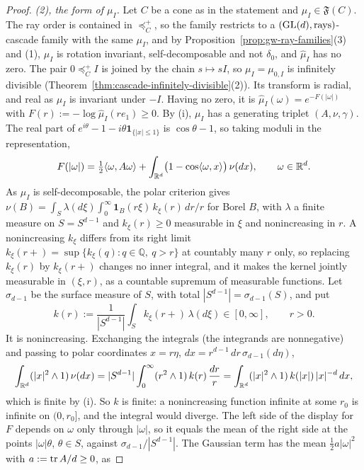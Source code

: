 \begin{proof}
\emph{(2), the form of $\mu_I$.} Let $C$ be a cone as in the statement and $\mu_I \in \mathfrak F(C)$. The ray order
is contained in $\preceq^+_C$, so the family restricts to a $(\mathrm{GL}(d), \text{rays})$-cascade family with the same
$\mu_I$, and by Proposition~\ref{prop:gw-ray-families}(3) and (1), $\mu_I$ is rotation invariant, self-decomposable and not
$\delta_0$, and $\widehat\mu_I$ has no zero. The pair $0 \preceq^+_C I$ is joined by the chain $s \mapsto sI$, so
$\mu_I = \mu_{0,I}$ is infinitely divisible (Theorem~\ref{thm:cascade-infinitely-divisible}(2)). Its transform is radial,
and real as $\mu_I$ is invariant under $-I$. Having no zero, it is $\widehat\mu_I(\omega) = e^{-F(|\omega|)}$ with
$F(r) := -\log\widehat\mu_I(re_1) \ge 0$. By (i), $\mu_I$ has a generating triplet $(A, \nu, \gamma)$.
The real part of $e^{i\theta} - 1 - i\theta\mathbf 1_{\{|x| \le 1\}}$ is $\cos\theta - 1$, so taking moduli in the
representation,
\[
  F(|\omega|) = \tfrac12\langle\omega, A\omega\rangle + \int_{\mathbb{R}^d}\bigl(1 - \cos\langle\omega,x\rangle\bigr)\,\nu(dx) ,
  \qquad \omega \in \mathbb{R}^d .
\]
As $\mu_I$ is self-decomposable, the polar criterion  gives
$\nu(B) = \int_S\lambda(d\xi)\int_0^\infty\mathbf 1_B(r\xi)\,k_\xi(r)\,dr/r$ for Borel $B$, with $\lambda$ a finite
measure on $S = S^{d-1}$ and $k_\xi(r) \ge 0$ measurable in $\xi$ and nonincreasing in $r$. A nonincreasing $k_\xi$
differs from its right limit $k_\xi(r+) = \sup\{k_\xi(q) : q \in \mathbb Q,\ q > r\}$ at countably many $r$ only,
so replacing $k_\xi(r)$ by $k_\xi(r+)$ changes no inner integral, and it makes the kernel jointly measurable in
$(\xi, r)$, as a countable supremum of measurable functions. Let $\sigma_{d-1}$ be the surface measure of $S$, with total
$|S^{d-1}| = \sigma_{d-1}(S)$, and put
\[
  k(r) := \frac{1}{|S^{d-1}|}\int_S k_\xi(r+)\,\lambda(d\xi) \in [0, \infty] , \qquad r > 0 .
\]
It is nonincreasing. Exchanging the integrals (the integrands are nonnegative) and passing to polar coordinates
$x = r\eta$, $dx = r^{d-1}\,dr\,\sigma_{d-1}(d\eta)$,
\[
  \int_{\mathbb{R}^d}(|x|^2 \wedge 1)\,\nu(dx) = |S^{d-1}|\int_0^\infty(r^2 \wedge 1)\,k(r)\,\frac{dr}{r}
  = \int_{\mathbb{R}^d}(|x|^2 \wedge 1)\,k(|x|)\,|x|^{-d}\,dx ,
\]
which is finite by (i). So $k$ is finite: a nonincreasing function infinite at some $r_0$ is infinite
on $(0, r_0]$, and the integral would diverge. The left side of the display for $F$ depends on $\omega$ only
through $|\omega|$, so it equals the mean of the right side at the points $|\omega|\theta$, $\theta \in S$, against
$\sigma_{d-1}/|S^{d-1}|$. The Gaussian term has the mean $\tfrac12 a|\omega|^2$ with $a := \operatorname{tr} A/d \ge 0$, as

\end{proof}
